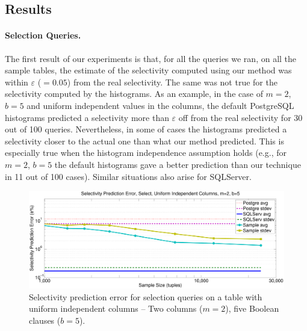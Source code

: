 \subsection{Results}
\paragraph{Selection Queries.} The first result of our experiments is that, for
all the queries we ran, on all the sample tables, the estimate of the
selectivity computed using our method was within
$\varepsilon$ ($=0.05$) from the real selectivity. The same was not true for the
selectivity computed by the histograms. As an example, in the case of $m=2$,
$b=5$ and uniform independent values in the columns, the default PostgreSQL
histograms predicted a selectivity more than $\varepsilon$ off from the real
selectivity for 30 out of 100 queries.  Nevertheless, in some of cases the
histograms predicted a selectivity closer to the actual one than what our method
predicted. This is especially true when the histogram independence assumption
holds (e.g., for $m=2$, $b=5$ the default histograms gave a better prediction
than our technique in 11 out of 100 cases). Similar situations also arise for
SQLServer.

\begin{figure}[tp]
  \centering
  \includegraphics[scale=0.30]{vcfreq/T_k5_u200k_unif_k2_b5_errperc}
  \caption{Selectivity prediction error for selection queries on a table with
  uniform independent columns -- Two columns ($m=2$), five Boolean clauses ($b=5$).}
  \label{fig:vcfreqT_k5_u200k_unif_k2_b5_errperc}
\end{figure}

